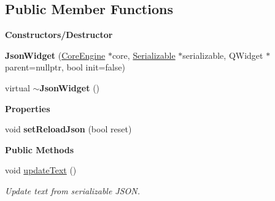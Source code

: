 \subsection*{Public Member Functions}
\begin{Indent}\textbf{ Constructors/\+Destructor}\par
\begin{DoxyCompactItemize}
\item 
\mbox{\label{classrev_1_1_view_1_1_json_widget_ae3002e8ccddabf26f833ea0dfba7042c}} 
{\bfseries Json\+Widget} (\mbox{\hyperlink{classrev_1_1_core_engine}{Core\+Engine}} $\ast$core, \mbox{\hyperlink{classrev_1_1_serializable}{Serializable}} $\ast$serializable, Q\+Widget $\ast$parent=nullptr, bool init=false)
\item 
\mbox{\label{classrev_1_1_view_1_1_json_widget_a35ed535b7c2801460e6ce407c89da098}} 
virtual {\bfseries $\sim$\+Json\+Widget} ()
\end{DoxyCompactItemize}
\end{Indent}
\begin{Indent}\textbf{ Properties}\par
\begin{DoxyCompactItemize}
\item 
\mbox{\label{classrev_1_1_view_1_1_json_widget_a0747ba7f955428f8b8d36422aafefce2}} 
void {\bfseries set\+Reload\+Json} (bool reset)
\end{DoxyCompactItemize}
\end{Indent}
\begin{Indent}\textbf{ Public Methods}\par
\begin{DoxyCompactItemize}
\item 
\mbox{\label{classrev_1_1_view_1_1_json_widget_a1c02238594be93ae3ccad2241c573a15}} 
void \mbox{\hyperlink{classrev_1_1_view_1_1_json_widget_a1c02238594be93ae3ccad2241c573a15}{update\+Text}} ()
\begin{DoxyCompactList}\small\item\em Update text from serializable J\+S\+ON. \end{DoxyCompactList}\end{DoxyCompactItemize}
\end{Indent}
